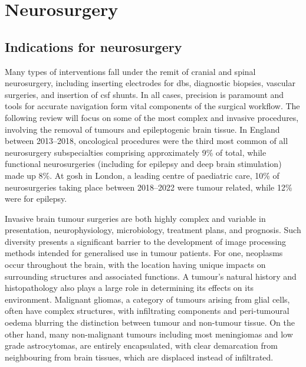 
\section{Neurosurgery}\label{sec:neurosurgery}

\subsection{Indications for neurosurgery}


Many types of interventions fall under the remit of cranial and spinal neurosurgery, including inserting electrodes for \gls{dbs}, diagnostic biopsies, vascular surgeries, and insertion of \gls{csf} shunts.
In all cases, precision is paramount and tools for accurate navigation form vital components of the surgical workflow.
The following review will focus on some of the most complex and invasive procedures, involving the removal of tumours and epileptogenic brain tissue.
In England between 2013--2018, oncological procedures were the third most common of all neurosurgery subspecialties comprising approximately 9\% of total, while functional neurosurgeries (including for epilepsy and deep brain stimulation) made up 8\%\autocite{Wahba2022}.
At \gls{gosh} in London, a leading centre of paediatric care, 10\% of neurosurgeries taking place between 2018--2022 were tumour related, while 12\% were for epilepsy\autocite{gosh2023}.

Invasive brain tumour surgeries are both highly complex and variable in presentation, neurophysiology, microbiology, treatment plans, and prognosis.
Such diversity presents a significant barrier to the development of image processing methods intended for generalised use in tumour patients\autocite{Bauer2013}.
For one, neoplasms occur throughout the brain, with the location having unique impacts on surrounding structures and associated functions.
A tumour's natural history and histopathology also plays a large role in determining its effects on its environment.
Malignant gliomas, a category of tumours arising from glial cells, often have complex structures, with infiltrating components and peri-tumoural oedema blurring the distinction between tumour and non-tumour tissue\autocite{Weller2021}.
On the other hand, many non-malignant tumours including most meningiomas and low grade astrocytomas, are entirely encapsulated, with clear demarcation from neighbouring from brain tissues, which are displaced instead of infiltrated\autocite{Lu2004,Gerard2017}.

